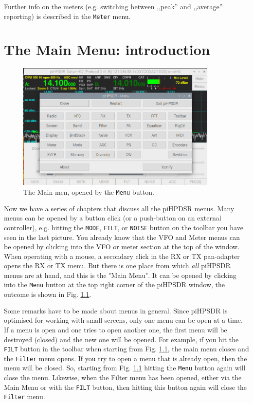 \documentclass[12pt]{book}
\def\rett#1{\texttt{\color{red}#1}}
\def\bltt#1{\texttt{\color{blue}#1}}
\def\pH{pi\-HPSDR }
\begin{document}
Further info on the meters (e.g. switching between ,,peak'' and ,,average'' reporting)
is described in the \bltt{Meter} menu.

\chapter{The Main Menu: introduction}

\begin{figure}[ht]
\center
\includegraphics[width=10cm]{MainMenu.png}
\caption{The Main men, opened by the \rett{Menu} button.}
\label{fig:MainMenu}
\end{figure}

Now we have a series of chapters that discuss all the piHPDSR menus. Many menus can be
opened by a button click (or a push-button on an external controller), e.g. hitting the
 \rett{MODE}, \rett{FILT}, or \rett{NOISE} button on the
toolbar you have seen in the last picture. You already know that the VFO and Meter
menus can be opened by clicking into the VFO or meter section at the top of the window.
When operating with a mouse, a secondary click in the RX or TX pan-adapter opens the
RX or TX menu. But there is one place from which \textit{all} \pH menus are at hand,
and this is the "Main Menu". It can be opened by clicking into the \rett{Menu} button at the
top right corner of the \pH window, the outcome is shown in Fig. \ref{fig:MainMenu}.

Some remarks have to be made about menus in general. Since \pH is optimised for
working with small screens, only one menu can be open at a time. If a menu is open
and one tries to open another one, the first menu will be destroyed (closed) and the
new one will be opened. For example, if you hit the \rett{FILT} button in the toolbar
when starting from Fig. \ref{fig:MainMenu}, the main menu closes and the \bltt{Filter} menu
opens. If you try to open a menu that is already open, then the menu will be closed.
So, starting from Fig. \ref{fig:MainMenu} hitting the \rett{Menu} button again will close
the menu. Likewise, when the Filter menu has been opened, either via the Main Menu
or with the \rett{FILT} button, then hitting this button again will close the
\bltt{Filter} menu.
\end{document}
